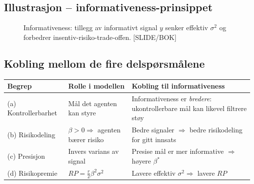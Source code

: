 \subsection*{Illustrasjon -- informativeness-prinsippet}

\begin{figure}[H]
\centering
{}
\caption{Informativeness: tillegg av informativt signal $y$ senker effektiv $\sigma^2$ og forbedrer insentiv-risiko-trade-offen. [SLIDE/BOK]}
\end{figure}

\subsection*{Kobling mellom de fire delspørsmålene}

\begin{center}
\renewcommand{\arraystretch}{1.15}
\begin{tabular}{@{}p{3.2cm}p{4.5cm}p{5.5cm}@{}}
\toprule
\textbf{Begrep} & \textbf{Rolle i modellen} & \textbf{Kobling til informativeness} \\
\midrule
(a) Kontrollerbarhet & Mål det agenten kan styre & Informativeness er \emph{bredere}: ukontrollerbare mål kan likevel filtrere støy \\
(b) Risikodeling & $\beta>0 \Rightarrow$ agenten bærer risiko & Bedre signaler $\Rightarrow$ bedre risikodeling for gitt innsats \\
(c) Presisjon & Invers varians av signal & Presise mål er mer informative $\Rightarrow$ høyere $\beta^*$ \\
(d) Risikopremie & $RP = \tfrac{r}{2}\beta^2\sigma^2$ & Lavere effektiv $\sigma^2 \Rightarrow$ lavere $RP$ \\
\bottomrule
\end{tabular}
\end{center}

